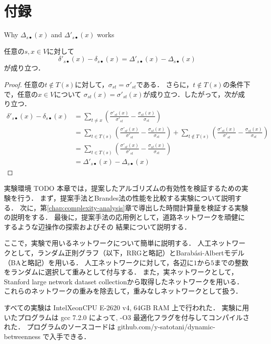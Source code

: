 \documentclass[dvipdfmx,fleqn]{beamer}
\begin{document}
\section{付録}
\begin{frame}{Why $\Delta_{s\bullet}(x)$ and $\Delta'_{s\bullet}(x)$ works}
  \begin{theorem}
    任意の$s,x\in V$に対して
    \begin{equation*}
      \delta'_{s\bullet}(x)-\delta_{s\bullet}(x)=\Delta'_{s\bullet}(x)-\Delta_{s\bullet}(x)
    \end{equation*}
    が成り立つ．
  \end{theorem}
  \begin{proof}
    任意の$t\notin T(s)$に対して，$\sigma_{st}=\sigma'_{st}$である．
    さらに，$t\notin T(s)$の条件下で，任意の$x\in V$について
    $\sigma_{st}(x)=\sigma'_{st}(x)$が成り立つ．したがって，次が成り立つ．
    \begin{equation*}
      \begin{aligned}
        \delta'_{s\bullet}(x)-\delta_{s\bullet}(x)
        &=\sum_{t\neq x}\left(\frac{\sigma'_{st}(x)}{\sigma'_{st}}-\frac{\sigma_{st}(x)}{\sigma_{st}}\right) \\
        &=\sum_{t\in T(s)}\left(\frac{\sigma'_{st}(x)}{\sigma'_{st}}-\frac{\sigma_{st}(x)}{\sigma_{st}}\right)
        +\sum_{t\notin T(s)}\left(\frac{\sigma'_{st}(x)}{\sigma'_{st}}-\frac{\sigma_{st}(x)}{\sigma_{st}}\right) \\
        &=\sum_{t\in T(s)}\left(\frac{\sigma'_{st}(x)}{\sigma'_{st}}-\frac{\sigma_{st}(x)}{\sigma_{st}}\right) \\
        &=\Delta'_{s\bullet}(x)-\Delta_{s\bullet}(x)
      \end{aligned}
    \end{equation*}
  \end{proof}
\end{frame}

\begin{frame}{実験環境}
  \alert{TODO}
  本章では，提案したアルゴリズムの有効性を検証するための実験を行う．
  まず，提案手法とBrandes法の性能を比較する実験について説明する．
  次に，第\ref{chap:complexity-analysis}章で導出した時間計算量を検証する実験の説明をする．
  最後に，提案手法の応用例として，道路ネットワークを頑健にするような辺操作の探索およびその
  結果について説明する．
  
  ここで，実験で用いるネットワークについて簡単に説明する．
  人工ネットワークとして，ランダム正則グラフ（以下，RRGと略記）とBarab{\'{a}}si-Albertモデル（BAと略記）を用いる．
  人工ネットワークに対して，各辺に$1$から$5$までの整数をランダムに選択して重みとして付与する．
  また，実ネットワークとして，Stanford large network dataset collection\cite{32Leskovec2016}から取得したネットワークを用いる．
  これらのネットワークの重みを除去して，重みなしネットワークとして扱う．
  
  すべての実験は Intel\textsuperscript\textregistered Xeon\textsuperscript\textregistered CPU E-2620 v4, 64GB RAM 上で行われた．
  実験に用いたプログラムは gcc 7.2.0 によって, -O3 最適化フラグを付与してコンパイルされた．
  プログラムのソースコードは github.com/y-satotani/dynamic-betweenness で入手できる．
\end{frame}
\end{document}
